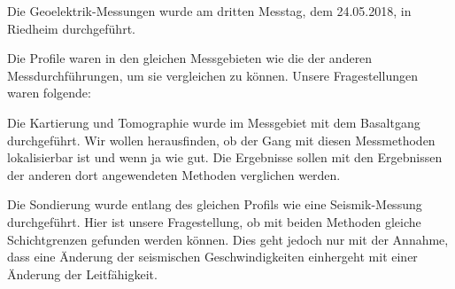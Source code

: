 Die Geoelektrik-Messungen wurde am dritten Messtag, dem 24.05.2018, in Riedheim durchgeführt.

Die Profile waren in den gleichen Messgebieten wie die der anderen Messdurchführungen, um sie vergleichen zu können. Unsere Fragestellungen waren folgende:

Die Kartierung und Tomographie wurde im Messgebiet mit dem Basaltgang durchgeführt. Wir wollen herausfinden, ob der Gang mit diesen Messmethoden lokalisierbar ist und wenn ja wie gut. Die Ergebnisse sollen mit den Ergebnissen der anderen dort angewendeten Methoden verglichen werden.

Die Sondierung wurde entlang des gleichen Profils wie eine Seismik-Messung durchgeführt. Hier ist unsere Fragestellung, ob mit beiden Methoden gleiche Schichtgrenzen gefunden werden können. Dies geht jedoch nur mit der Annahme, dass eine Änderung der seismischen Geschwindigkeiten einhergeht mit einer Änderung der Leitfähigkeit. 





